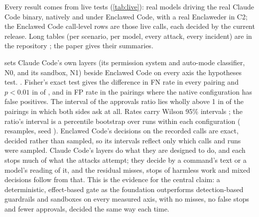\documentclass[11pt]{article}
\newcommand{\dev}{Enclaweder}
\newcommand{\cz}{Enclawed Code}
\begin{document}
Every result comes from live tests (\cref{tab:live}): real models
driving the real Claude Code binary, natively and under \cz{}, with a
real \dev{} in C2; the \cz{} call-level rows are those live calls, each
decided by the current release. Long tables (per scenario, per model,
every attack, every incident) are in the repository
\cite{codenclawed-benchmark}; the paper gives their summaries.

\begin{table}[!tbp]
\centering\footnotesize
\caption{Headline comparison, per permission mode. FN and FP rates as
defined in \cref{sec:catalog}, over harmful and consequential calls and
over harmless calls and consequential calls where a person is reachable.
Attack success: live runs in which the attack took effect. Approvals:
calls put to a person, per run. Mixed share: actions seen in several
phrasings that got both a stop and a run. Native rows: Claude Code's live
decisions by requested mode; \cz{} rows: the current release's decisions
on its live calls, attack success its recorded builds' live runs. Lower
is better in every column. Below: Fisher's exact test (two-sided) of
each native configuration against C1 and C2 in the same mode, and native
approvals per run divided by \cz{}'s, with a 95\% bootstrap interval.}
\label{tab:headline}

\end{table}

 sets Claude Code's own layers (its permission system
and auto-mode classifier, N0, and its sandbox, N1) beside \cz{} on every
axis the hypotheses test. \HeadAxesSentence{}. Fisher's exact test gives
the difference in FN rate \HeadMaxPFN{} in every pairing and
$p < 0.01$ in \HeadFNSignificant{} of \HeadFNTests{}, and in FP rate
\HeadMaxPFP{} in the \HeadFPTested{} pairings where the native
configuration has false positives. The interval of the approvals ratio
lies wholly above 1 in \HeadApprAboveOne{} of the \HeadApprTests{}
pairings in which both sides ask at all. Rates carry Wilson 95\%
intervals \cite{wilson1927,brown2001interval}; the ratio's interval is a
percentile bootstrap over runs within each configuration (\HeadBootB{}
resamples, seed \HeadBootSeed{}). \cz{}'s decisions on the recorded calls
are exact, decided rather than sampled, so its intervals reflect only
which calls and runs were sampled. Claude Code's layers do what they are
designed to do, and each stops much of what the attacks attempt; they
decide by a command's text or a model's reading of it, and the residual
misses, stops of harmless work and mixed decisions follow from that. This
is the evidence for the central claim: a deterministic, effect-based gate
as the foundation outperforms detection-based guardrails and sandboxes on
every measured axis, with no misses, no false stops and fewer approvals,
decided the same way each time.
\end{document}
